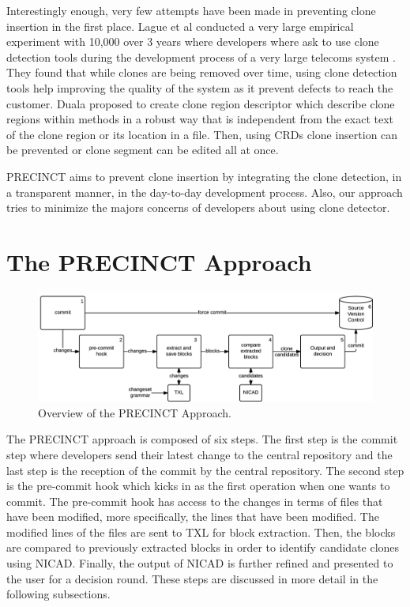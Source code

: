 \documentclass[conference]{IEEEtran}
\begin{document}
Interestingly enough, very few attempts have been made in preventing clone insertion in the first place.
Lague et al conducted a very large empirical experiment with 10,000 over 3 years where developers where ask to use clone detection tools during the development process of a very large telecoms system \cite{Lague}.
They found that while clones are being removed over time, using clone detection tools help improving the quality of the system as it prevent defects to reach the customer.
Duala proposed to create clone region descriptor which describe clone regions within methods in a robust way that is independent from the exact text of the clone region or its location in a file. Then, using CRDs clone insertion can be prevented or clone segment can be edited all at once\cite{Duala-Ekoko2007,Duala-Ekoko2010}.

PRECINCT aims to prevent clone insertion by integrating the clone detection, in a transparent manner, in the day-to-day development process.
Also, our approach tries to minimize the majors concerns of developers about using clone detector.




\section{The PRECINCT Approach}
\label{sec:The PRECINCT Approach}

\begin{figure}
  \centering
    \includegraphics[width=\textwidth]{media/approach.png}
    \caption{ Overview of the PRECINCT Approach.\label{fig:precinct-approach}}
\end{figure}

The PRECINCT approach is composed of six steps.
The first step is the commit step where developers send their latest change to the central repository and the last step is the reception of the commit by the central repository.
The second step is the pre-commit hook which kicks in as the first operation when one wants to commit.
The pre-commit hook has access to the changes in terms of files that have been modified, more specifically, the lines that have been modified. The modified lines of the files are sent to TXL\cite{Cordy2006a} for block extraction. Then, the blocks are compared to previously extracted blocks in order to identify candidate clones  using NICAD\cite{Cordy2011}.
 Finally, the output of NICAD is further refined and presented to the user for a decision round. These steps are discussed in more detail in the following subsections.
\end{document}
